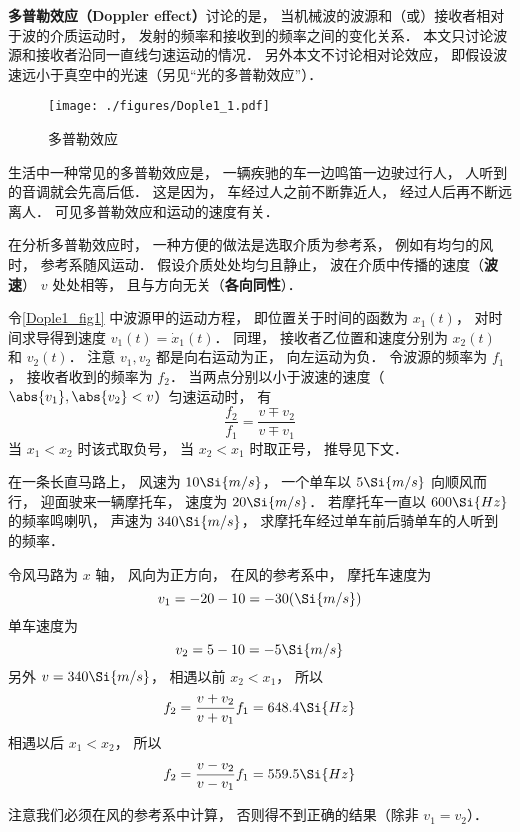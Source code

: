 

\textbf{多普勒效应（Doppler effect）}讨论的是， 当机械波的波源和（或）接收者相对于波的介质运动时， 发射的频率和接收到的频率之间的变化关系． 本文只讨论波源和接收者沿同一直线匀速运动的情况． 另外本文不讨论相对论效应， 即假设波速远小于真空中的光速（另见“光的多普勒效应”）．

\begin{figure}[ht]
\centering
\texttt{[image: ./figures/Dople1\_1.pdf]}
\caption{多普勒效应} \label{Dople1_fig1}
\end{figure}

\begin{example}{}
生活中一种常见的多普勒效应是， 一辆疾驰的车一边鸣笛一边驶过行人， 人听到的音调就会先高后低． 这是因为， 车经过人之前不断靠近人， 经过人后再不断远离人． 可见多普勒效应和运动的速度有关．
\end{example}

在分析多普勒效应时， 一种方便的做法是选取介质为参考系， 例如有均匀的风时， 参考系随风运动． 假设介质处处均匀且静止， 波在介质中传播的速度（\textbf{波速}） $v$ 处处相等， 且与方向无关（\textbf{各向同性}）．

令\autoref{Dople1_fig1} 中波源甲的运动方程， 即位置关于时间的函数为 $x_1(t)$， 对时间求导得到速度 $v_1(t) = \dot{x}_1(t)$． 同理， 接收者乙位置和速度分别为 $x_2(t)$ 和 $v_2(t)$． 注意 $v_1, v_2$ 都是向右运动为正， 向左运动为负． 令波源的频率为 $f_1$， 接收者收到的频率为 $f_2$． 当两点分别以小于波速的速度（$\abs{v_1}, \abs{v_2} < v$）匀速运动时， 有
\begin{equation}\label{Dople1_eq1}
\frac{f_2}{f_1} = \frac{v \mp v_2}{v \mp v_1}
\end{equation}
当 $x_1 < x_2$ 时该式取负号， 当 $x_2 < x_1$ 时取正号， 推导见下文．

\begin{exercise}{}
在一条长直马路上， 风速为 $10\Si{m/s}$， 一个单车以 $5\Si{m/s}$ 向顺风而行， 迎面驶来一辆摩托车， 速度为 $20\Si{m/s}$． 若摩托车一直以 $600\Si{Hz}$ 的频率鸣喇叭， 声速为 $340\Si{m/s}$， 求摩托车经过单车前后骑单车的人听到的频率．

令风马路为 $x$ 轴， 风向为正方向， 在风的参考系中， 摩托车速度为
\begin{equation}
v_1 = -20 - 10 = -30(\Si{m/s})
\end{equation}
单车速度为
\begin{equation}
v_2 = 5 - 10 = -5\Si{m/s}
\end{equation}
另外 $v = 340\Si{m/s}$， 相遇以前 $x_2 < x_1$， 所以
\begin{equation}
f_2 = \frac{v + v_2}{v + v_1} f_1 = 648.4\Si{Hz}
\end{equation}
相遇以后 $x_1 < x_2$， 所以
\begin{equation}
f_2 = \frac{v - v_2}{v - v_1} f_1 = 559.5\Si{Hz}
\end{equation}
\end{exercise}
注意我们必须在风的参考系中计算， 否则得不到正确的结果（除非 $v_1 = v_2$）．

